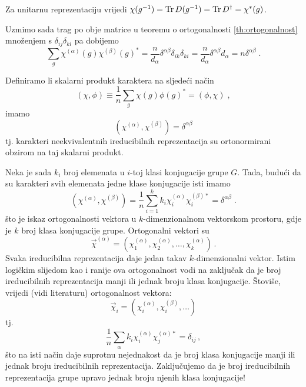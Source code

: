 Za unitarnu reprezentaciju vrijedi $\chi(g^{-1}) = \operatorname{Tr} D(g^{-1})= \operatorname{Tr} D^{\dagger}
    = \chi^{*}(g)$.


Uzmimo sada trag po obje matrice
u teoremu o ortogonalnosti \ref{th:ortogonalnost} množenjem
s $\delta_{ij}\delta_{kl}$ pa dobijemo
\begin{displaymath}
\sum_g \chi^{(\alpha)}(g) \chi^{(\beta)}(g)^* = 
\frac{n}{d_{\alpha}} \delta^{\alpha\beta} \delta_{ik}\delta_{ki} =
\frac{n}{d_{\alpha}} \delta^{\alpha\beta} d_{\alpha} =
n \delta^{\alpha\beta} \;.
\end{displaymath}

Definiramo li skalarni produkt karaktera na sljedeći način
 \begin{displaymath}
(\chi, \phi) \equiv \frac{1}{n} \sum_g \chi(g) \phi(g)^* = (\phi, \chi) \;,
\end{displaymath}
imamo
\begin{displaymath}
(\chi^{(\alpha)}, \chi^{(\beta)}) = \delta^{\alpha\beta}
\end{displaymath}
tj. karakteri neekvivalentnih ireducibilnih reprezentacija su ortonormirani
obzirom na taj skalarni produkt.

Neka je sada $k_i$ broj elemenata u $i$-toj klasi konjugacije grupe $G$.
Tada, budući da su karakteri svih elemenata jedne klase konjugacije
isti imamo
\begin{displaymath}
(\chi^{(\alpha)}, \chi^{(\beta)})=\frac{1}{n} \sum_{i=1}^{k}  k_i
 \chi^{(\alpha)}_i \chi^{(\beta)*}_{i} = \delta^{\alpha\beta} \;.
\end{displaymath}
što je iskaz ortogonalnosti vektora u $k$-dimenzionalnom vektorskom
prostoru, gdje je $k$ broj klasa konjugacije grupe. Ortogonalni vektori su
\begin{displaymath}
\vec{\chi}^{(\alpha)} = (\chi^{(\alpha)}_1, \chi^{(\alpha)}_2, \ldots,
 \chi^{(\alpha)}_{k}) \,.
\end{displaymath}
Svaka ireducibilna reprezentacija daje jedan takav $k$-dimenzionalni vektor.
Istim logičkim slijedom kao i ranije ova ortogonalnost vodi na zaključak 
da je broj
ireducibilnih reprezentacija  manji ili jednak broju klasa konjugacije. Štoviše, vrijedi
(vidi literaturu) ortogonalnost vektora:
\begin{displaymath}
\vec{\chi}_i = (\chi^{(\alpha)}_i, \chi^{(\beta)}_i, \ldots)
\end{displaymath}
tj.
\begin{displaymath}
\frac{1}{n} \sum_{\alpha} k_i \chi^{(\alpha)}_i \chi^{(\alpha)*}_j =
\delta_{ij} \,,
\end{displaymath}
što na isti način daje suprotnu nejednakost da je broj klasa konjugacije manji
ili jednak broju ireducibilnih reprezentacija.
Zaključujemo da je broj ireducibilnih reprezentacija grupe 
upravo jednak broju njenih klasa konjugacije!

